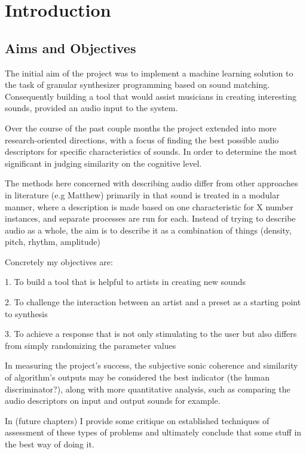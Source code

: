 \chapter{Introduction}
\label{chapterlabel1}

\section{Aims and Objectives}
The initial aim of the project was to implement a machine learning solution to
the task of granular synthesizer programming based on sound matching.
Consequently building a tool that would assist musicians in creating interesting
sounds, provided an audio input to the system.

Over the course of the past couple months the project extended into more
research-oriented directions, with a focus of finding the best possible audio
descriptors for specific characteristics of sounds. In order to determine the
most significant in judging similarity on the cognitive level.

The methods here concerned with describing audio differ from other approaches in
literature (e.g Matthew) primarily in that sound is treated in a modular manner,
where a description is made based on one characteristic for X number instances,
and separate processes are run for each. Instead of trying to describe audio as
a whole, the aim is to describe it as a combination of things (density, pitch,
rhythm, amplitude)

Concretely my objectives are:

1. To build a tool that is helpful to artists in creating new sounds 

2. To challenge the interaction between an artist and a preset as a starting
point to synthesis 

3. To achieve a response that is not only stimulating to the user but also differs
from simply randomizing the parameter values 

In measuring the project's success, the subjective sonic coherence and
similarity of algorithm's outputs may be considered the best indicator (the
human discriminator?), along with more quantitative analysis, such as comparing
the audio descriptors on input and output sounds for example.

In (future chapters) I provide some critique on established techniques of
assessment of these types of problems and ultimately conclude that some stuff in
the best way of doing it.

